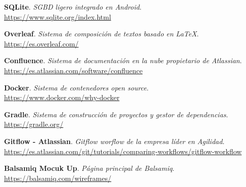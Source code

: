 \begin{thebibliography}{X}
\textbf{SQLite}. \textit{SGBD ligero integrado en Android}. \\
\small{\url{https://www.sqlite.org/index.html}}

\textbf{Overleaf}. \textit{Sistema de composición de textos basado en \LaTeX}. \\
\small{\url{https://es.overleaf.com/}}

\textbf{Confluence}. \textit{Sistema de documentación en la nube propietario de Atlassian}. \\
\small{\url{https://es.atlassian.com/software/confluence}}

\textbf{Docker}. \textit{Sistema de contenedores open source}. \\
\small{\url{https://www.docker.com/why-docker}}

\textbf{Gradle}. \textit{Sistema de construcción de proyectos y gestor de dependencias}. \\
\small{\url{https://gradle.org/}}

\textbf{Gitflow - Atlassian}. \textit{Gitflow worflow de la empresa líder en Agilidad}. \\
\small{\url{https://es.atlassian.com/git/tutorials/comparing-workflows/gitflow-workflow}}

\textbf{Balsamiq Mocuk Up}. \textit{Página principal de Balsamiq}. \\
\small{\url{https://balsamiq.com/wireframes/}}



\end{thebibliography}